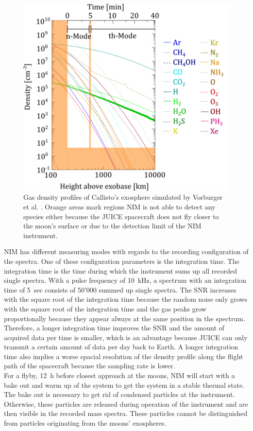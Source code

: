 	\begin{figure}[h!]
		\centering
		\includegraphics[width=.7\textwidth]{Bilder/Vorburger_Icarus_2015.png}
		\caption{Gas density profiles of Callisto's exosphere simulated by Vorburger et al. \cite{Vorburger2015}. Orange areas mark regions NIM is not able to detect any species either because the JUICE spacecraft does not fly closer to the moon's surface or due to the detection limit of the NIM instrument.} %
		\label{fig:VorburgIc2015}
	\end{figure}
	NIM has different measuring modes with regards to the recording configuration of the spectra. One of these configuration parameters is the integration time. The integration time is the time during which the instrument sums up all recorded single spectra. With a pulse frequency of 10~kHz, a spectrum with an integration time of 5~sec consists of 50'000 summed up single spectra. The SNR increases with the square root of the integration time because the random noise only grows with the square root of the integration time and the gas peaks grow proportionally because they appear always at the same position in the spectrum. Therefore, a longer integration time improves the SNR and the amount of acquired data per time is smaller, which is an advantage because JUICE can only transmit a certain amount of data per day back to Earth. A longer integration time also implies a worse spacial resolution of the density profile along the flight path of the spacecraft because the sampling rate is lower.\\
	For a flyby, 12~h before closest approach at the moons, NIM will start with a bake out and warm up of the system to get the system in a stable thermal state. The bake out is necessary to get rid of condensed particles at the instrument. Otherwise, these particles are released during operation of the instrument and are then visible in the recorded mass spectra. These particles cannot be distinguished from particles originating from the moons' exospheres.\\
